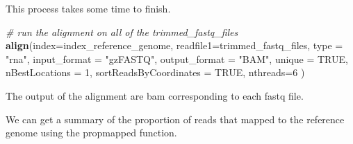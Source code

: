 \documentclass[
]{book}
\newenvironment{Shaded}{\begin{snugshade}}{\end{snugshade}}
\newcommand{\AttributeTok}[1]{\textcolor[rgb]{0.13,0.29,0.53}{#1}}
\newcommand{\CommentTok}[1]{\textcolor[rgb]{0.56,0.35,0.01}{\textit{#1}}}
\newcommand{\ConstantTok}[1]{\textcolor[rgb]{0.56,0.35,0.01}{#1}}
\newcommand{\DecValTok}[1]{\textcolor[rgb]{0.00,0.00,0.81}{#1}}
\newcommand{\FunctionTok}[1]{\textcolor[rgb]{0.13,0.29,0.53}{\textbf{#1}}}
\newcommand{\NormalTok}[1]{#1}
\newcommand{\OtherTok}[1]{\textcolor[rgb]{0.56,0.35,0.01}{#1}}
\newcommand{\StringTok}[1]{\textcolor[rgb]{0.31,0.60,0.02}{#1}}
\begin{document}
This process takes some time to finish.

\begin{Shaded}
\begin{Highlighting}[]
\CommentTok{\# run the alignment on all of the trimmed\_fastq\_files}
\FunctionTok{align}\NormalTok{(}\AttributeTok{index=}\NormalTok{index\_reference\_genome, }
      \AttributeTok{readfile1=}\NormalTok{trimmed\_fastq\_files,}
      \AttributeTok{type =} \StringTok{"rna"}\NormalTok{,}
      \AttributeTok{input\_format =} \StringTok{"gzFASTQ"}\NormalTok{,}
      \AttributeTok{output\_format =} \StringTok{"BAM"}\NormalTok{,}
      \AttributeTok{unique =} \ConstantTok{TRUE}\NormalTok{,}
      \AttributeTok{nBestLocations =} \DecValTok{1}\NormalTok{,}
      \AttributeTok{sortReadsByCoordinates =} \ConstantTok{TRUE}\NormalTok{,}
      \AttributeTok{nthreads=}\DecValTok{6}
\NormalTok{      )}
\end{Highlighting}
\end{Shaded}

The output of the alignment are bam corresponding to each fastq file.

We can get a summary of the proportion of reads that mapped to the reference genome using the propmapped function.

\begin{Shaded}
\end{Shaded}
\end{document}
